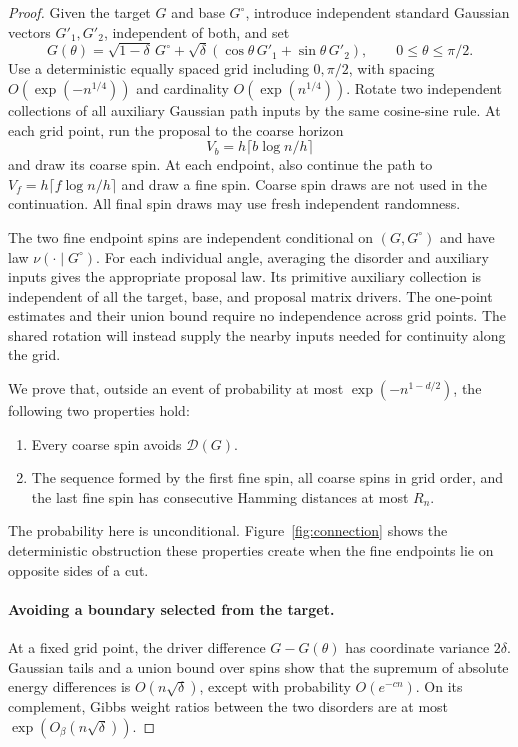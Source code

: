 \begin{proof}
Given the target $G$ and base $G^\circ$, introduce independent
standard Gaussian vectors $G'_1,G'_2$, independent of both, and set
\[
 G(\theta)=\sqrt{1-\delta}\,G^\circ+
       \sqrt\delta(\cos\theta\,G'_1+\sin\theta\,G'_2),
 \qquad 0\le\theta\le\pi/2.
\]
Use a deterministic equally spaced grid including $0,\pi/2$, with
spacing $O(\exp(-n^{1/4}))$ and cardinality
$O(\exp(n^{1/4}))$. Rotate two independent collections of all
auxiliary Gaussian path inputs by the same cosine-sine rule.
At each grid point, run the proposal to the coarse horizon
\[
 V_b=h\lceil b\log n/h\rceil
\]
and draw its coarse spin. At each endpoint, also continue the path
to $V_f=h\lceil f\log n/h\rceil$ and draw a fine spin. Coarse
spin draws are not used in the continuation. All final spin draws
may use fresh independent randomness.

The two fine endpoint spins are independent conditional on
$(G,G^\circ)$ and have law $\nu(\cdot\mid G^\circ)$.
For each individual angle, averaging the disorder and auxiliary
inputs gives the appropriate proposal law. Its primitive auxiliary
collection is independent of all the target, base, and proposal
matrix drivers. The one-point estimates and their union bound require
no independence across grid points. The shared rotation will instead
supply the nearby inputs needed for continuity along the grid.

We prove that, outside an event of probability at most
$\exp(-n^{1-d/2})$, the following two properties hold:
\begin{enumerate}
\item Every coarse spin avoids $\mathcal D(G)$.
\item The sequence formed by the first fine spin, all coarse spins in
grid order, and the last fine spin has consecutive Hamming distances
at most $R_n$.
\end{enumerate}
The probability here is unconditional. Figure~\ref{fig:connection}
shows the deterministic obstruction these properties create when the
fine endpoints lie on opposite sides of a cut.


\paragraph{Avoiding a boundary selected from the target.}
At a fixed grid point, the driver difference $G-G(\theta)$ has
coordinate variance $2\delta$. Gaussian tails and a union bound over
spins show that the supremum of absolute energy differences is
$O(n\sqrt\delta)$, except with probability $O(e^{-cn})$.
On its complement, Gibbs weight ratios between the two disorders
are at most $\exp(O_\beta(n\sqrt\delta))$.


\end{proof}
